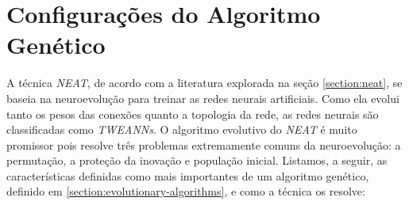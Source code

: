 \section{\label{section:modelling-genetic}Configurações do Algoritmo Genético}
A técnica \textit{NEAT}, de acordo com a literatura explorada na seção
\ref{section:neat}, se baseia na neuroevolução para treinar as redes neurais
artificiais. Como ela evolui tanto os pesos das conexões quanto a topologia da
rede, as redes neurais são classificadas como \textit{TWEANNs}. O algoritmo
evolutivo do \textit{NEAT} é muito promissor pois resolve três problemas
extremamente comuns da neuroevolução: a permutação, a proteção da inovação e
população inicial. Listamos, a seguir, as características definidas como mais
importantes de um algoritmo genético, definido em
\ref{section:evolutionary-algorithms}, e como a técnica os resolve:

